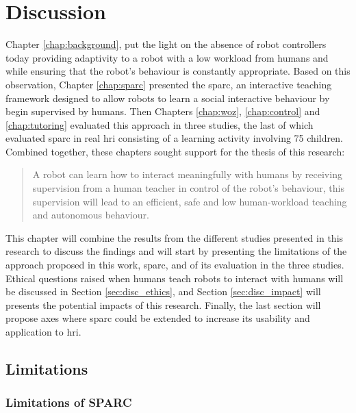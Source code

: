 \chapter{Discussion} \label{chap:discussion}
\glsresetall

Chapter \ref{chap:background}, put the light on the absence of robot controllers today providing adaptivity to a robot with a low workload from humans and while ensuring that the robot's behaviour is constantly appropriate. Based on this observation, Chapter \ref{chap:sparc} presented the \gls{sparc}, an interactive teaching framework designed to allow robots to learn a social interactive behaviour by begin supervised by humans. Then Chapters \ref{chap:woz}, \ref{chap:control} and \ref{chap:tutoring} evaluated this approach in three studies, the last of which evaluated \gls{sparc} in real \gls{hri} consisting of a learning activity involving 75 children. Combined together, these chapters sought support for the thesis of this research:

\begin{quote}
	A robot can learn how to interact meaningfully with humans by receiving supervision from a human teacher in control of the robot's behaviour, this supervision will lead to an efficient, safe and low human-workload teaching and autonomous behaviour.	
\end{quote}

This chapter will combine the results from the different studies presented in this research to discuss the findings and will start by presenting the limitations of the approach proposed in this work, \gls{sparc}, and of its evaluation in the three studies. Ethical questions raised when humans teach robots to interact with humans will be discussed in Section \ref{sec:disc_ethics}, and Section \ref{sec:disc_impact} will presents the potential impacts of this research. Finally, the last section will propose axes where \gls{sparc} could be extended to increase its usability and application to \gls{hri}.

\section{Limitations} \label{sec:disc_limitations}

\subsection{Limitations of SPARC}

